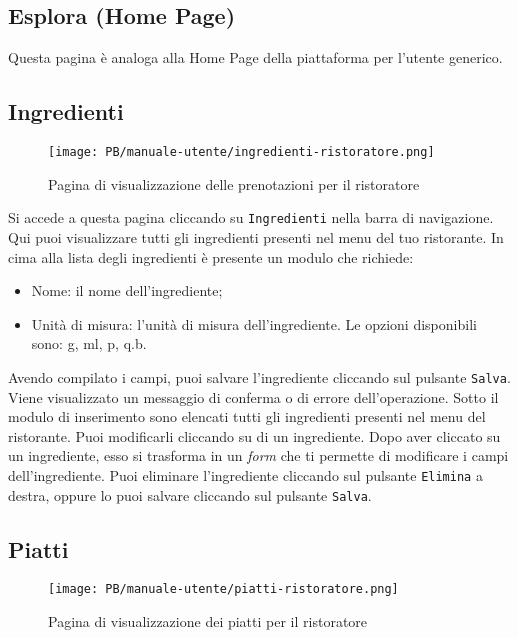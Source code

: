 \subsection{Esplora (Home Page)}

Questa pagina è analoga alla Home Page della piattaforma per l'utente generico.

\subsection{Ingredienti}

\begin{figure}[htbp]
    \centering
	\texttt{[image: PB/manuale-utente/ingredienti-ristoratore.png]}
    \caption{Pagina di visualizzazione delle prenotazioni per il ristoratore}
\end{figure}

Si accede a questa pagina cliccando su \texttt{Ingredienti} nella barra di
navigazione. Qui puoi visualizzare tutti gli ingredienti presenti nel menu del
tuo ristorante. In cima alla lista degli ingredienti è presente un modulo che
richiede:
\begin{itemize}
	\item Nome: il nome dell'ingrediente;
	\item Unità di misura: l'unità di misura dell'ingrediente. Le opzioni
		disponibili sono: g, ml, p, q.b.
\end{itemize}

Avendo compilato i campi, puoi salvare l'ingrediente cliccando sul pulsante
\texttt{Salva}. Viene visualizzato un messaggio di conferma o di errore
dell'operazione. Sotto il modulo di inserimento sono elencati tutti gli
ingredienti presenti nel menu del ristorante. Puoi modificarli cliccando su di
un ingrediente. Dopo aver cliccato su un ingrediente, esso si trasforma in un
\textit{form} che ti permette di modificare i campi dell'ingrediente. Puoi eliminare
l'ingrediente cliccando sul pulsante \texttt{Elimina} a destra, oppure lo puoi
salvare cliccando sul pulsante \texttt{Salva}.

\subsection{Piatti}

\begin{figure}[htbp]
    \centering
	\texttt{[image: PB/manuale-utente/piatti-ristoratore.png]}
    \caption{Pagina di visualizzazione dei piatti per il ristoratore}
\end{figure}

